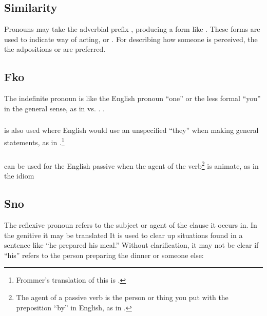\subsection{Similarity} Pronouns may take the adverbial prefix
, producing a form like  . These forms
are used to indicate way of acting,   or . For describing how someone is
perceived, the the adpositions  or  are preferred. 

\subsection{Fko} The indefinite pronoun  is like the English
pronoun ``one'' or the less formal ``you'' in the general sense, as in
 vs. .  
 .

\subsubsection{}  is also used where English would use an
unspecified ``they'' when making general statements, as in
.\footnote{Frommer's
translation of this is .}

\subsubsection{}  can be used for the English passive when the
agent of the verb\footnote{The agent of a passive verb is the person
or thing you put with the preposition ``by'' in English, as in .} is animate, as in the idiom    
\label{syn:prn:fko}

\subsection{Sno} 
The reflexive pronoun  refers to the subject or agent of the
clause it occurs in.  In the genitive it may be translated   It is used to clear up situations found in
a sentence like ``he prepared his meal.''  Without clarification, it
may not be clear if ``his'' refers to the person preparing the dinner
or someone else:

